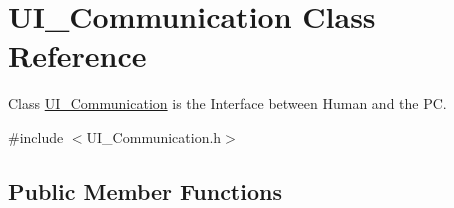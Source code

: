 \hypertarget{class_u_i___communication}{}\section{U\+I\+\_\+\+Communication Class Reference}
\label{class_u_i___communication}


Class \mbox{\hyperlink{class_u_i___communication}{U\+I\+\_\+\+Communication}} is the Interface between Human and the PC.  




{\ttfamily \#include $<$U\+I\+\_\+\+Communication.\+h$>$}

\subsection*{Public Member Functions}
